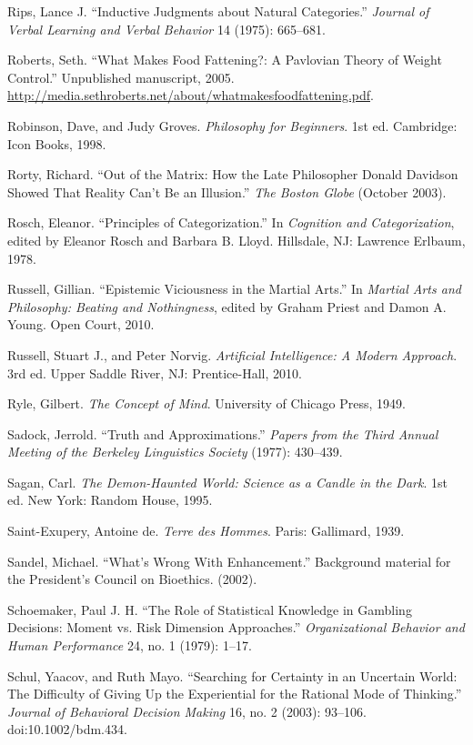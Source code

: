 {
 Rips, Lance J. ``Inductive Judgments about
Natural Categories.'' \textit{Journal of Verbal
Learning and Verbal Behavior} 14 (1975): 665--681.}

{
 Roberts, Seth. ``What Makes Food Fattening?: A
Pavlovian Theory of Weight Control.'' Unpublished
manuscript, 2005.
\url{http://media.sethroberts.net/about/whatmakesfoodfattening.pdf}.}

{
 Robinson, Dave, and Judy Groves. \textit{Philosophy for
Beginners}. 1st ed. Cambridge: Icon Books, 1998.}

{
 Rorty, Richard. ``Out of the Matrix: How the Late
Philosopher Donald Davidson Showed That Reality Can't
Be an Illusion.'' \textit{The Boston Globe} (October
2003).}

{
 Rosch, Eleanor. ``Principles of
Categorization.'' In \textit{Cognition and
Categorization}, edited by Eleanor Rosch and Barbara B. Lloyd.
Hillsdale, NJ: Lawrence Erlbaum, 1978.}

{
 Russell, Gillian. ``Epistemic Viciousness in the
Martial Arts.'' In \textit{Martial Arts and
Philosophy: Beating and Nothingness}, edited by Graham Priest and Damon
A. Young. Open Court, 2010.}

{
 Russell, Stuart J., and Peter Norvig. \textit{Artificial
Intelligence: A Modern Approach}. 3rd ed. Upper Saddle River, NJ:
Prentice-Hall, 2010.}

{
 Ryle, Gilbert. \textit{The Concept of Mind}. University of Chicago
Press, 1949.}

{
 Sadock, Jerrold. ``Truth and
Approximations.'' \textit{Papers from the Third
Annual Meeting of the Berkeley Linguistics Society} (1977): 430--439.}

{
 Sagan, Carl. \textit{The Demon-Haunted World: Science as a Candle
in the Dark}. 1st ed. New York: Random House, 1995.}

{
 Saint-Exupery, Antoine de. \textit{Terre des Hommes}. Paris:
Gallimard, 1939.}

{
 Sandel, Michael. ``What's Wrong
With Enhancement.'' Background material for the
President's Council on Bioethics. (2002).}

{
 Schoemaker, Paul J. H. ``The Role of Statistical
Knowledge in Gambling Decisions: Moment vs. Risk Dimension
Approaches.'' \textit{Organizational Behavior and
Human Performance} 24, no. 1 (1979): 1--17.}

{
 Schul, Yaacov, and Ruth Mayo. ``Searching for
Certainty in an Uncertain World: The Difficulty of Giving Up the
Experiential for the Rational Mode of Thinking.''
\textit{Journal of Behavioral Decision Making} 16, no. 2 (2003):
93--106. doi:10.1002/bdm.434.}

